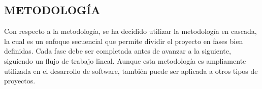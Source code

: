 \begin{center}
    \item  \section{METODOLOGÍA}
\end{center}
Con respecto a la metodología, se ha decidido utilizar la metodología en cascada, la cual es un enfoque secuencial que permite dividir el proyecto en fases bien definidas. Cada fase debe ser completada antes de avanzar a la siguiente, siguiendo un flujo de trabajo lineal. Aunque esta metodología es ampliamente utilizada en el desarrollo de software, también puede ser aplicada a otros tipos de proyectos.